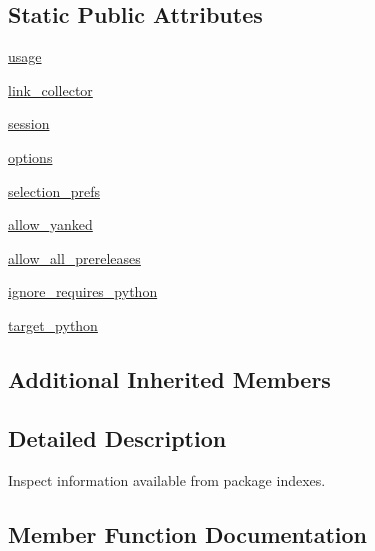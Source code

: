 \subsection*{Static Public Attributes}
\begin{DoxyCompactItemize}
\item 
\hyperlink{classpip_1_1__internal_1_1commands_1_1index_1_1IndexCommand_a6ab3bcd623d871d480df4e6af075bfd6}{usage}
\item 
\hyperlink{classpip_1_1__internal_1_1commands_1_1index_1_1IndexCommand_a0a66ae53e59a098a57f6fb564416c6f8}{link\+\_\+collector}
\item 
\hyperlink{classpip_1_1__internal_1_1commands_1_1index_1_1IndexCommand_a3c4b81fdb2379314803d7b22c4879141}{session}
\item 
\hyperlink{classpip_1_1__internal_1_1commands_1_1index_1_1IndexCommand_acc49f6b30926ad01e7e84132f957f9b8}{options}
\item 
\hyperlink{classpip_1_1__internal_1_1commands_1_1index_1_1IndexCommand_aff5fb4c10750c039aef066376da96082}{selection\+\_\+prefs}
\item 
\hyperlink{classpip_1_1__internal_1_1commands_1_1index_1_1IndexCommand_ae77df473f698d08da63e734d61da010e}{allow\+\_\+yanked}
\item 
\hyperlink{classpip_1_1__internal_1_1commands_1_1index_1_1IndexCommand_abe5b0af7553ad6d973bc37c2e16cfafe}{allow\+\_\+all\+\_\+prereleases}
\item 
\hyperlink{classpip_1_1__internal_1_1commands_1_1index_1_1IndexCommand_a01da93636093f15a74bdbf220b43c560}{ignore\+\_\+requires\+\_\+python}
\item 
\hyperlink{classpip_1_1__internal_1_1commands_1_1index_1_1IndexCommand_a5a9d6974728d25dcd3dc4c0cb8eae5e3}{target\+\_\+python}
\end{DoxyCompactItemize}
\subsection*{Additional Inherited Members}


\subsection{Detailed Description}
\begin{DoxyVerb}Inspect information available from package indexes.
\end{DoxyVerb}
 

\subsection{Member Function Documentation}
\mbox{\label{classpip_1_1__internal_1_1commands_1_1index_1_1IndexCommand_aa61811ab9946feccb09c27e7e2f601db}} 
